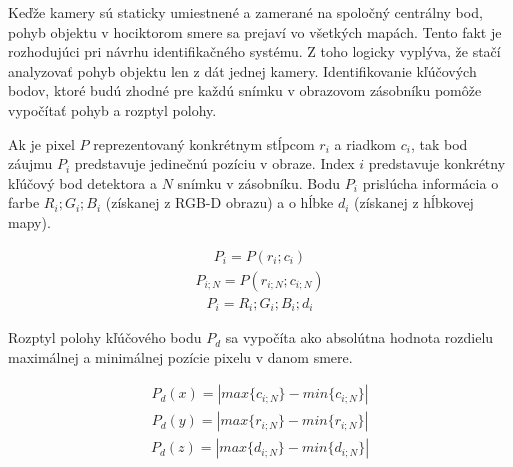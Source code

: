 Keďže kamery sú staticky umiestnené a zamerané na spoločný centrálny bod, pohyb objektu v hociktorom smere sa prejaví vo všetkých mapách. Tento fakt je rozhodujúci pri návrhu identifikačného systému. Z toho logicky vyplýva, že stačí analyzovať pohyb objektu len z dát jednej kamery. Identifikovanie kľúčových bodov, ktoré budú zhodné pre každú snímku v obrazovom zásobníku pomôže vypočítať pohyb a rozptyl polohy. \newline

Ak je pixel $P$ reprezentovaný konkrétnym stĺpcom $r_{i}$ a riadkom $c_{i}$, tak bod záujmu $P_{i}$ predstavuje jedinečnú pozíciu v obraze. Index $i$ predstavuje konkrétny kľúčový bod detektora a $N$ snímku v zásobníku. Bodu $P_{i}$ prislúcha informácia o farbe $R_{i};G_{i};B_{i}$ (získanej z RGB-D obrazu) a o hĺbke $d_{i}$ (získanej z hĺbkovej mapy).

\begin{equation}
\label{eq:pixels:a}
\begin{aligned}
P_{i}=P\left(r_{i};c_{i}\right)
\end{aligned}
\end{equation}
\begin{equation}
\label{eq:pixels:b}
\begin{aligned}
P_{i;N}=P\left(r_{i;N};c_{i;N}\right)
\end{aligned}
\end{equation}
\begin{equation}
\label{eq:pixels:c}
\begin{aligned}
P_{i}=R_{i};G_{i};B_{i};d_{i}
\end{aligned}
\end{equation}

\noindent Rozptyl polohy kľúčového bodu $P_d$ sa vypočíta ako absolútna hodnota rozdielu maximálnej a minimálnej pozície pixelu v danom smere. 

\begin{equation}
\label{eq:pixels:d}
\begin{aligned}
P_d\left(x\right)=\left|  max\lbrace c_{i;N} \rbrace -min\lbrace c_{i;N} \rbrace \right| 
\end{aligned}
\end{equation}
\begin{equation}
\label{eq:pixels:e}
\begin{aligned}
P_d\left(y\right)=\left|  max\lbrace r_{i;N} \rbrace -min\lbrace r_{i;N} \rbrace \right| 
\end{aligned}
\end{equation}
\begin{equation}
\label{eq:pixels:f}
\begin{aligned}
P_d\left(z\right)=\left|  max\lbrace d_{i;N} \rbrace -min\lbrace d_{i;N} \rbrace \right| 
\end{aligned}
\end{equation}

